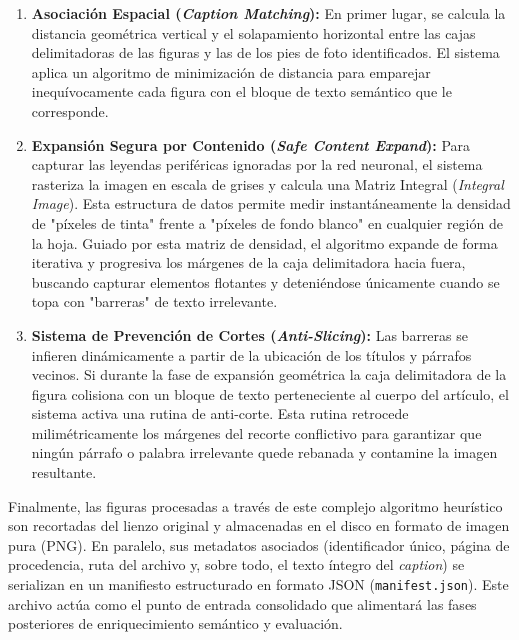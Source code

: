 \documentclass[a4paper]{report}
\begin{document}
\begin{enumerate}
    \item \textbf{Asociación Espacial (\textit{Caption Matching}):} En primer lugar, se calcula la distancia geométrica vertical y el solapamiento horizontal entre las cajas delimitadoras de las figuras y las de los pies de foto identificados. El sistema aplica un algoritmo de minimización de distancia para emparejar inequívocamente cada figura con el bloque de texto semántico que le corresponde.
    
    \item \textbf{Expansión Segura por Contenido (\textit{Safe Content Expand}):} Para capturar las leyendas periféricas ignoradas por la red neuronal, el sistema rasteriza la imagen en escala de grises y calcula una Matriz Integral (\textit{Integral Image}). Esta estructura de datos permite medir instantáneamente la densidad de "píxeles de tinta" frente a "píxeles de fondo blanco" en cualquier región de la hoja. Guiado por esta matriz de densidad, el algoritmo expande de forma iterativa y progresiva los márgenes de la caja delimitadora hacia fuera, buscando capturar elementos flotantes y deteniéndose únicamente cuando se topa con "barreras" de texto irrelevante.
    
    \item \textbf{Sistema de Prevención de Cortes (\textit{Anti-Slicing}):} Las barreras se infieren dinámicamente a partir de la ubicación de los títulos y párrafos vecinos. Si durante la fase de expansión geométrica la caja delimitadora de la figura colisiona con un bloque de texto perteneciente al cuerpo del artículo, el sistema activa una rutina de anti-corte. Esta rutina retrocede milimétricamente los márgenes del recorte conflictivo para garantizar que ningún párrafo o palabra irrelevante quede rebanada y contamine la imagen resultante.
\end{enumerate}

Finalmente, las figuras procesadas a través de este complejo algoritmo heurístico son recortadas del lienzo original y almacenadas en el disco en formato de imagen pura (PNG). En paralelo, sus metadatos asociados (identificador único, página de procedencia, ruta del archivo y, sobre todo, el texto íntegro del \textit{caption}) se serializan en un manifiesto estructurado en formato JSON (\texttt{manifest.json}). Este archivo actúa como el punto de entrada consolidado que alimentará las fases posteriores de enriquecimiento semántico y evaluación.

\begingroup
\let\clearpage\relax %
\let\newpage\relax   %
\vspace{0.5cm}       %
\end{document}
